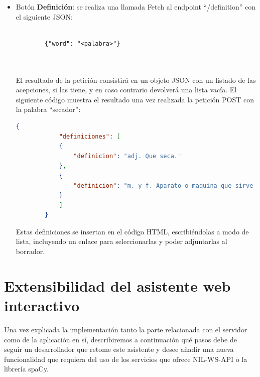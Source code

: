 \begin{itemize}
	\item Botón \textbf{Definición}: se realiza una llamada Fetch al endpoint ``/definition'' con el siguiente JSON:
		\begin{lstlisting}
		
		{"word": "<palabra>"}
		
		
	\end{lstlisting}
	
	 El resultado de la petición consistirá en un objeto JSON con un listado de las acepciones, si las tiene, y en caso contrario devolverá una lista vacía. El siguiente código muestra el resultado una vez realizada la petición POST con la palabra ``secador'':
	 	\begin{lstlisting}[language=json,firstnumber=1]
	 	{
	 		"definiciones": [
	 		{
	 			"definicion": "adj. Que seca."
	 		},
	 		{
	 			"definicion": "m. y f. Aparato o maquina que sirve para secar."
	 		}
	 		]
	 	}
	 \end{lstlisting}
	Estas definiciones se insertan en el código HTML, escribiéndolas a modo de lista, incluyendo un enlace para seleccionarlas y poder adjuntarlas al borrador.    
	




\end{itemize}


\section{Extensibilidad del asistente web interactivo}
Una vez explicada la implementación tanto la parte relacionada con el servidor como de la aplicación en sí, describiremos a continuación qué pasos debe de seguir un desarrollador que retome este asistente y desee añadir una nueva funcionalidad que requiera del uso de los servicios que ofrece NIL-WS-API o la librería spaCy.


